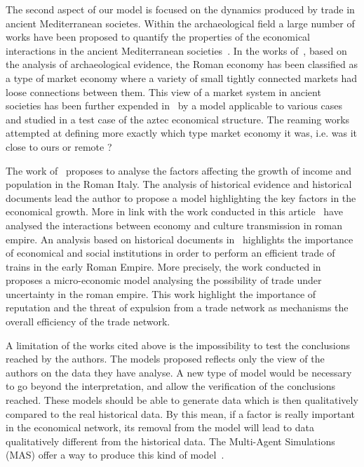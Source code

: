 \documentclass{wscpaperproc}
\begin{document}
The second aspect of our model is focused on the dynamics produced by trade in ancient Mediterranean societes. Within the archaeological field a large number of works have been proposed to quantify the properties of the economical interactions in the ancient Mediterranean societies~\cite{hopkins_taxes_1980,temin_market_2001,terpstra_trade_2011,minc_monitoring_2006,temin_economy_2006,wilson_approaches_2009,scheidel_model_2007,kessler_organization_2007}. In the works of~\cite{temin_market_2001,temin_economy_2006,wilson_approaches_2009}, based on the analysis of archaeological evidence, the Roman economy has been classified as a type of market economy where a variety of small tightly connected markets had loose connections between them. This view of a market system in ancient societies has been further expended in~\cite{minc_monitoring_2006} by a model applicable to various cases and studied in a test case of the aztec economical structure. The reaming works attempted at defining more exactly which type market economy it was, i.e. was it close to ours or remote ? 


The work of~\cite{scheidel_model_2007} proposes to analyse the factors affecting the growth of income and population in the Roman Italy. The analysis of historical evidence and historical documents lead the author to propose a model highlighting the key factors in the economical growth. More in link with the work conducted in this article~\cite{terpstra_trade_2011,kessler_organization_2007} have analysed the interactions between economy and culture transmission in roman empire. An analysis based on historical documents in~\cite{kessler_organization_2007} highlights the importance of economical and social institutions in order to perform an efficient trade of trains in the early Roman Empire. More precisely, the work conducted in~\cite{terpstra_trade_2011} proposes a micro-economic model analysing the possibility of trade under uncertainty in the roman empire. This work highlight the importance of reputation and the threat of expulsion from a trade network as mechanisms the overall efficiency of the trade network. 


A limitation of the works cited above is the impossibility to test the conclusions reached by the authors. The models proposed reflects only the view of the authors on the data they have analyse. A new type of model would be necessary to go beyond the interpretation, and allow the verification of the conclusions reached. These models should be able to generate data which is then qualitatively compared to the real historical data. By this mean, if a factor is really important in the economical network, its removal from the model will lead to data qualitatively different from the historical data. The Multi-Agent Simulations (MAS) offer a way to produce this kind of model~\cite{lake_trends_2014}.
\end{document}

